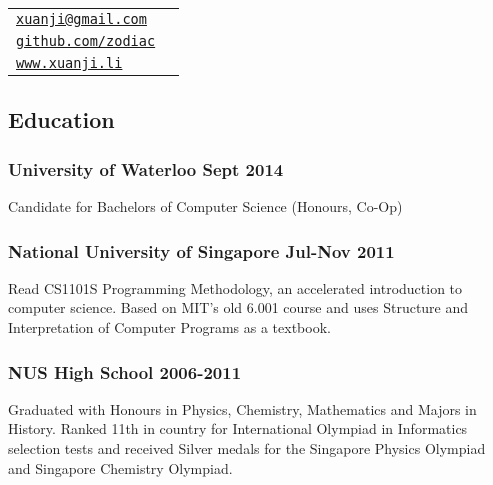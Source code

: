 \documentclass[letterpaper]{article}
\def\name{Li Xuanji}
\begin{document}
\vspace{0.25in}

\begin{minipage}{0.8\linewidth}
\resizebox{0.5\linewidth}{!}{\fontsize{30}{36}\selectfont \name}
\end{minipage}
\begin{minipage}{0.2\linewidth}
  \begin{tabular}{ll}
    \href{mailto:xuanji@gmail.com}{\tt xuanji@gmail.com} \\
    \href{https://github.com/zodiac}{\tt github.com/zodiac} \\
    \href{www.xuanji.li}{\tt www.xuanji.li}
  \end{tabular}
\end{minipage}

\vspace{2em}

\begin{center}
\section*{Education}
\end{center}

\subsubsection*{University of Waterloo \hfill Sept 2014}
Candidate for Bachelors of Computer Science (Honours, Co-Op)

\subsubsection*{National University of Singapore \hfill Jul-Nov 2011}
Read CS1101S Programming Methodology, an accelerated introduction to computer science. Based on MIT's old 6.001 course and uses Structure and Interpretation of Computer Programs as a textbook.

\subsubsection*{NUS High School \hfill 2006-2011}
Graduated with Honours in Physics, Chemistry, Mathematics and Majors in History. Ranked 11th in country for International Olympiad in Informatics selection tests and received Silver medals for the Singapore Physics Olympiad and Singapore Chemistry Olympiad.


\vspace{1em}
\end{document}
